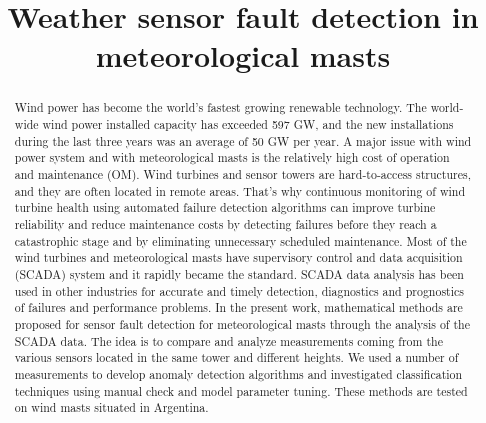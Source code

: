 \documentclass[conference]{IEEEtran}
\begin{document}
\title{Weather sensor fault detection in meteorological masts}

\author{

\and
{}

\and
{}
}


\maketitle

\begin{abstract}
Wind power has become the world's fastest growing renewable technology. The world-wide wind power installed capacity has exceeded 597 GW, and the new installations during the last three years was an average of 50 GW per year. A major issue with wind power system and with meteorological masts is the relatively high cost of operation and maintenance (OM). Wind turbines and sensor towers are hard-to-access structures, and they are often located in remote areas. That's why continuous monitoring of wind turbine health using automated failure detection algorithms can improve turbine reliability and reduce maintenance costs by detecting failures before they reach a catastrophic stage and by eliminating unnecessary scheduled maintenance.
Most of the wind turbines and meteorological masts have supervisory control and data acquisition (SCADA) system and it rapidly became the standard. SCADA data analysis has been used in other industries for accurate and timely detection, diagnostics and prognostics of failures and performance problems.
In the present work, mathematical methods are proposed for sensor fault detection for meteorological masts through the analysis of the SCADA data. The idea is to compare and analyze measurements coming from the various sensors located in the same tower and different heights. We used a number of measurements to develop anomaly detection algorithms and investigated classification techniques using manual check and model parameter tuning. 
These methods are tested on wind masts situated in Argentina.
\end{abstract}
\end{document}
